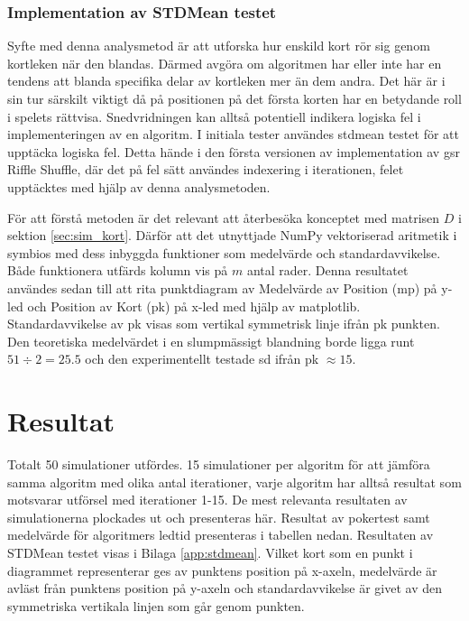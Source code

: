 \documentclass[swedish,a4paper]{article}
\begin{document}
\subsubsection{Implementation av STDMean testet}
Syfte med denna analysmetod är att utforska hur enskild kort rör sig genom
kortleken när den blandas. Därmed avgöra om algoritmen har eller inte har en
tendens att blanda specifika delar av kortleken mer än dem andra. Det här är i sin
tur särskilt viktigt då på positionen på det första korten har en betydande roll i spelets rättvisa. Snedvridningen kan alltså
potentiell indikera logiska fel i implementeringen av en algoritm. I initiala
tester användes \gls{stdmean} testet för att upptäcka logiska fel. Detta hände i
den första versionen av implementation av \gls{gsr} Riffle Shuffle, där det på
fel sätt användes indexering i iterationen, felet upptäcktes med hjälp av denna
analysmetoden. 

För att förstå metoden är det relevant att återbesöka konceptet med matrisen $D$
i sektion \ref{sec:sim_kort}. Därför att det utnyttjade NumPy vektoriserad
aritmetik i symbios med dess inbyggda funktioner som medelvärde och
standardavvikelse. Både funktionera utfärds kolumn vis på $m$ antal rader.
Denna resultatet användes sedan till att rita punktdiagram av Medelvärde av
Position (\gls{mp}) på y-led  och Position av Kort (\gls{pk}) på x-led med hjälp
av matplotlib. Standardavvikelse av \gls{pk} visas som vertikal symmetrisk linje
ifrån \gls{pk} punkten. Den teoretiska medelvärdet i en slumpmässigt blandning
borde ligga runt $51 \div 2 = 25.5$ och den experimentellt testade \gls{sd}
ifrån \gls{pk} $\approx 15$.

\section{Resultat}


Totalt 50 simulationer utfördes. 15 simulationer per algoritm för att jämföra
samma algoritm med olika antal iterationer, varje algoritm har alltså resultat
som motsvarar utförsel med iterationer 1-15. De mest relevanta resultaten av
simulationerna plockades ut och presenteras här. Resultat av pokertest samt
medelvärde för algoritmers ledtid presenteras i tabellen nedan. Resultaten
av STDMean testet visas i Bilaga \ref{app:stdmean}. Vilket kort som en punkt i
diagrammet representerar ges av punktens position på x-axeln, medelvärde är
avläst från punktens position på y-axeln och standardavvikelse är givet av den
symmetriska vertikala linjen som går genom punkten.
\end{document}
